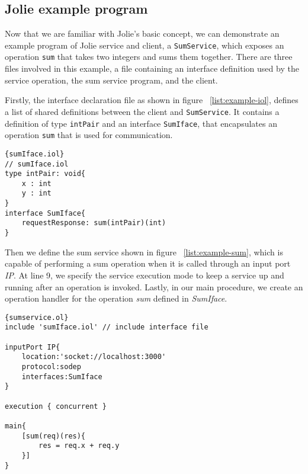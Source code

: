 \subsection{Jolie example program}

Now that we are familiar with Jolie's basic concept, we can demonstrate an example program of Jolie service and client, a \texttt{SumService}, which exposes an operation \texttt{sum} that takes two integers and sums them together. There are three files involved in this example, a file containing an interface definition used by the service operation, the sum service program, and the client.

Firstly, the interface declaration file as shown in figure ~\ref{list:example-iol}, defines a list of shared definitions between the client and \texttt{SumService}. It contains a definition of type \texttt{intPair} and an interface \texttt{SumIface}, that encapsulates an operation \texttt{sum} that is used for communication.

\begin{listing}[ht]
    \lstset{language=Jolie,
        style=codeStyle
    }
    \begin{lstlisting}[frame=tlrb]{sumIface.iol}
// sumIface.iol
type intPair: void{
    x : int
    y : int
}
interface SumIface{
    requestResponse: sum(intPair)(int)
}
\end{lstlisting}
\caption{Types and interfaces definitions for sum service, as a content in sumIface.iol }
\label{list:example-iol}
\end{listing}

Then we define the sum service shown in figure ~\ref{list:example-sum}, which is capable of performing a sum operation when it is called through an input port \textit{IP}. At line 9, we specify the service execution mode to keep a service up and running after an operation is invoked. Lastly, in our main procedure, we create an operation handler for the operation \textit{sum} defined in \textit{SumIface}.

\begin{listing}[ht]
    \lstset{language=Jolie,
        style=codeStyle,
        numbers=left,
        firstnumber=1
    }
    \begin{lstlisting}[frame=tlrb]{sumservice.ol}
include 'sumIface.iol' // include interface file

inputPort IP{
    location:'socket://localhost:3000'
    protocol:sodep 
    interfaces:SumIface
}

execution { concurrent }

main{
    [sum(req)(res){
        res = req.x + req.y
    }]
}
\end{lstlisting}
\caption{Jolie implementation of the summation service}
\label{list:example-sum}
\end{listing}

